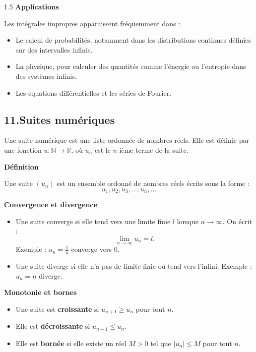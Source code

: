 \documentclass[12pt]{article}
\begin{document}
\begin{spacing}{1.5}
\textbf{ Applications}

Les intégrales impropres apparaissent fréquemment dans :
\begin{itemize}
    \item Le calcul de probabilités, notamment dans les distributions continues définies sur des intervalles infinis.
    \item La physique, pour calculer des quantités comme l'énergie ou l'entropie dans des systèmes infinis.
    \item Les équations différentielles et les séries de Fourier.
\end{itemize}



\subsection*{11.Suites numériques}
Une suite numérique est une liste ordonnée de nombres réels. Elle est définie par une fonction \( u : \mathbb{N} \to \mathbb{R} \), où \( u_n \) est le \( n \)-ième terme de la suite.

\textbf{Définition}

Une suite \( (u_n) \) est un ensemble ordonné de nombres réels écrits sous la forme :  
\[ u_1, u_2, u_3, \dots, u_n, \dots \]

\textbf{Convergence et divergence}

\begin{itemize}
    \item Une suite converge si elle tend vers une limite finie \( l \) lorsque \( n \to \infty \). On écrit :  
    \[ \lim_{n \to \infty} u_n = l. \]
    Exemple : \( u_n = \frac{1}{n} \) converge vers \( 0 \).  
    \item Une suite diverge si elle n’a pas de limite finie ou tend vers l'infini. Exemple : \( u_n = n \) diverge.
\end{itemize}

\textbf{Monotonie et bornes}

\begin{itemize}
    \item Une suite est \textbf{croissante} si \( u_{n+1} \geq u_n \) pour tout \( n \).  
    \item Elle est \textbf{décroissante} si \( u_{n+1} \leq u_n \).  
    \item Elle est \textbf{bornée} si elle existe un réel \( M > 0 \) tel que \( |u_n| \leq M \) pour tout \( n \).
\end{itemize}


\end{spacing}
\end{document}
